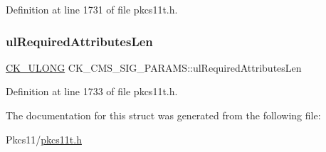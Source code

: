 Definition at line 1731 of file pkcs11t.\+h.

\mbox{\label{struct_c_k___c_m_s___s_i_g___p_a_r_a_m_s_a0849e6c4b7613787007c2b657f77810a}} 
\subsubsection{\texorpdfstring{ul\+Required\+Attributes\+Len}{ulRequiredAttributesLen}}
{\footnotesize\ttfamily \hyperlink{pkcs11t_8h_a35181858a3b7a0a81f49d180d8f446ef}{C\+K\+\_\+\+U\+L\+O\+NG} C\+K\+\_\+\+C\+M\+S\+\_\+\+S\+I\+G\+\_\+\+P\+A\+R\+A\+M\+S\+::ul\+Required\+Attributes\+Len}



Definition at line 1733 of file pkcs11t.\+h.



The documentation for this struct was generated from the following file\+:\begin{DoxyCompactItemize}
\item 
Pkcs11/\hyperlink{pkcs11t_8h}{pkcs11t.\+h}\end{DoxyCompactItemize}
